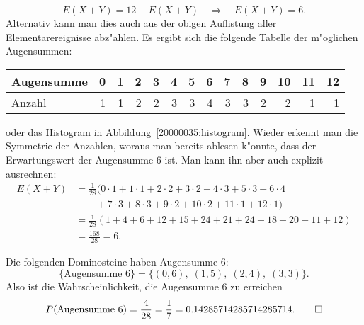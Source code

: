 \begin{loesung}
\begin{teilaufgaben}
\[
E(X+Y)= 12-E(X+Y)\quad\Rightarrow\quad E(X+Y)=6.
\]
Alternativ kann man dies auch aus der obigen Auflistung aller
Elementarereignisse abz"ahlen. Es ergibt sich die folgende Tabelle
der m"oglichen Augensummen:
\begin{center}
\begin{tabular}{|l|rrrrrrrrrrrrr|}
\hline
Augensumme & 0& 1& 2& 3& 4& 5& 6& 7& 8& 9& 10& 11& 12\\
\hline
Anzahl     & 1& 1& 2& 2& 3& 3& 4& 3& 3& 2&  2&  1&  1\\
\hline
\end{tabular}
\end{center}
oder das Histogram in Abbildung~\ref{20000035:histogram}.
Wieder erkennt man die Symmetrie der Anzahlen, woraus man bereits
ablesen k"onnte, dass der Erwartungswert der Augensumme $6$ ist.
Man kann ihn aber auch explizit ausrechnen:
\begin{align*}
E(X+Y)&=
\frac1{28}(
0\cdot 1+
1\cdot 1+
2\cdot 2+
3\cdot 2+
4\cdot 3+
5\cdot 3+
6\cdot 4\\
&\qquad +
7\cdot 3+
8\cdot 3+
9\cdot 2+
10\cdot 2+
11\cdot 1+
12\cdot 1
)
\\
&=
\frac1{28}(1+4+6+12+15+24+21+24+18+20+11+12)\\
&=
\frac{168}{28}=6.
\end{align*}
\item
Die folgenden Dominosteine haben Augensumme 6:
\[
\{\text{Augensumme 6}\}
=\{
(0,6),\;
(1,5),\;
(2,4),\;
(3,3)\}.
\]
Also ist die Wahrscheinlichkeit, die Augensumme 6 zu erreichen
\[
P(\text{Augensumme 6})=\frac{4}{28}=\frac17=0.14285714285714285714.
\qedhere
\]
\end{teilaufgaben}
\end{loesung}

